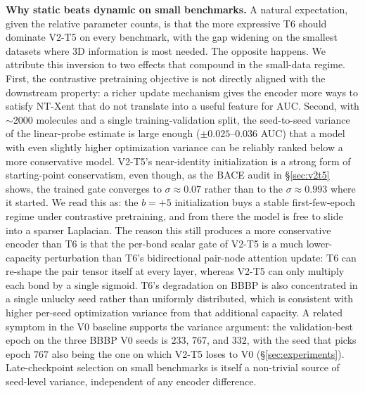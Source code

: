 \documentclass[conference]{IEEEtran}
\begin{document}
\noindent\textbf{Why static beats dynamic on small benchmarks.}
A natural expectation, given the relative parameter counts, is that the more expressive T6 should dominate V2-T5 on every benchmark, with the gap widening on the smallest datasets where 3D information is most needed. The opposite happens. We attribute this inversion to two effects that compound in the small-data regime. First, the contrastive pretraining objective is not directly aligned with the downstream property: a richer update mechanism gives the encoder more ways to satisfy NT-Xent that do not translate into a useful feature for AUC. Second, with $\sim$2000 molecules and a single training-validation split, the seed-to-seed variance of the linear-probe estimate is large enough ($\pm 0.025$--$0.036$ AUC) that a model with even slightly higher optimization variance can be reliably ranked below a more conservative model. V2-T5's near-identity initialization is a strong form of starting-point conservatism, even though, as the BACE audit in \S\ref{sec:v2t5} shows, the trained gate converges to $\sigma\approx 0.07$ rather than to the $\sigma\approx 0.993$ where it started. We read this as: the $b{=}{+}5$ initialization buys a stable first-few-epoch regime under contrastive pretraining, and from there the model is free to slide into a sparser Laplacian. The reason this still produces a more conservative encoder than T6 is that the per-bond scalar gate of V2-T5 is a much lower-capacity perturbation than T6's bidirectional pair-node attention update: T6 can re-shape the pair tensor itself at every layer, whereas V2-T5 can only multiply each bond by a single sigmoid. T6's degradation on BBBP is also concentrated in a single unlucky seed rather than uniformly distributed, which is consistent with higher per-seed optimization variance from that additional capacity. A related symptom in the V0 baseline supports the variance argument: the validation-best epoch on the three BBBP V0 seeds is $233$, $767$, and $332$, with the seed that picks epoch $767$ also being the one on which V2-T5 loses to V0 (\S\ref{sec:experiments}). Late-checkpoint selection on small benchmarks is itself a non-trivial source of seed-level variance, independent of any encoder difference.
\end{document}
